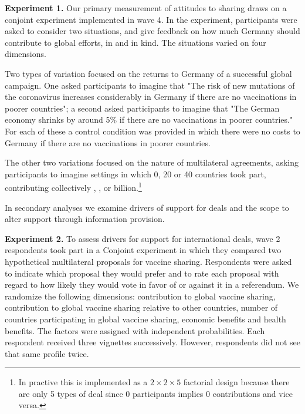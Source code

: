 \documentclass[12pt,oneside,smallheadings,chapterprefix=true]{article}
\begin{document}
\textbf{Experiment 1.} Our primary measurement of attitudes to sharing draws on a conjoint experiment implemented in wave 4. In the experiment, participants were asked to consider two situations, and give feedback on how much Germany should contribute to global efforts, in \texteuros and in kind. The situations varied on four dimensions. 

Two types of variation focused on the returns to Germany of a successful global campaign. One asked participants to imagine that "The risk of new mutations of the coronavirus increases considerably in Germany if there are no vaccinations in poorer countries"; a second asked participants to imagine that "The German economy shrinks by around 5\% if there are no vaccinations in poorer countries." For each of these a control condition was provided in which there were no costs to Germany if there are no vaccinations in poorer countries.

The other two variations focused on the nature of multilateral agreements, asking participants to imagine settings in which 0, 20 or 40 countries took part, contributing collectively , , or  billion.\footnote{In practive this is implemented as a $2\times2\times5$ factorial design because there are only 5 types of deal since 0 participants implies 0 contributions and vice versa.}
 
In secondary analyses we examine drivers of support for deals and the scope to alter support through information provision. 

\textbf{Experiment 2.} To assess drivers for support for international deals, wave 2 respondents took part in a Conjoint experiment in which they compared two hypothetical multilateral proposals for vaccine sharing. Respondents were asked  to indicate which proposal they would prefer and to rate each proposal with regard to how likely they would vote in favor of or against it in a referendum. We randomize the following dimensions: contribution to global vaccine sharing, contribution to global vaccine sharing relative to other countries, number of countries participating in global vaccine sharing, economic benefits and health benefits. The factors were assigned with independent probabilities. Each respondent received three vignettes successively. However, respondents did not see that same profile twice. 
\end{document}
